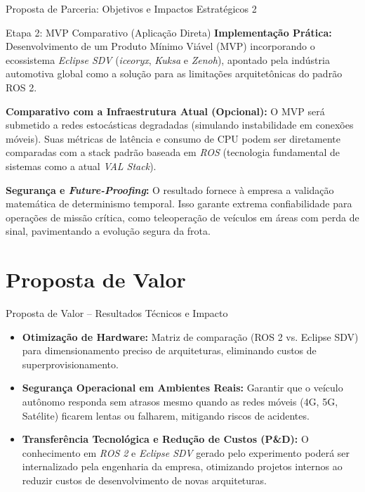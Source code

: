 \documentclass[aspectratio=169,xcolor=dvipsnames]{beamer}
\begin{document}
\begin{frame}{Proposta de Parceria: Objetivos e Impactos Estratégicos 2}
    \begin{block}{Etapa 2: MVP Comparativo (Aplicação Direta)}
        \small
        \textbf{Implementação Prática:} Desenvolvimento de um Produto Mínimo Viável (MVP) incorporando o ecossistema \textit{Eclipse SDV} (\textit{iceoryx}, \textit{Kuksa} e \textit{Zenoh}), apontado pela indústria automotiva global como a solução para as limitações arquitetônicas do padrão ROS 2.\\ \vspace{1.5ex}

        \textbf{Comparativo com a Infraestrutura Atual (Opcional):} O MVP será submetido a redes estocásticas degradadas (simulando instabilidade em conexões móveis). Suas métricas de latência e consumo de CPU podem ser diretamente comparadas com a stack padrão baseada em \textit{ROS} (tecnologia fundamental de sistemas como a atual \textit{VAL Stack}).\\ \vspace{1.5ex}

        \textbf{Segurança e \textit{Future-Proofing}:} O resultado fornece à empresa a validação matemática de determinismo temporal. Isso garante extrema confiabilidade para operações de missão crítica, como teleoperação de veículos em áreas com perda de sinal, pavimentando a evolução segura da frota.
    \end{block}
\end{frame}

\section{Proposta de Valor}
\begin{frame}{Proposta de Valor -- Resultados Técnicos e Impacto}
    \begin{itemize}
        \item \textbf{Otimização de Hardware:} Matriz de comparação (ROS 2 vs. Eclipse SDV) para dimensionamento preciso de arquiteturas, eliminando custos de superprovisionamento.

              \vspace{1.5ex}
        \item \textbf{Segurança Operacional em Ambientes Reais:} Garantir que o veículo autônomo responda sem atrasos mesmo quando as redes móveis (4G, 5G, Satélite) ficarem lentas ou falharem, mitigando riscos de acidentes.

              \vspace{1.5ex}
        \item \textbf{Transferência Tecnológica e Redução de Custos (P\&D):} O conhecimento em \textit{ROS 2} e \textit{Eclipse SDV} gerado pelo experimento poderá ser internalizado pela engenharia da empresa, otimizando projetos internos ao reduzir custos de desenvolvimento de novas arquiteturas.
    \end{itemize}
\end{frame}
\end{document}
